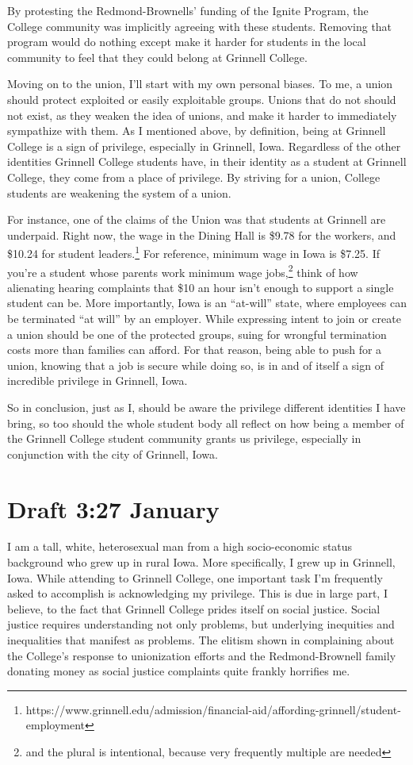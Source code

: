 \documentclass[12pt]{article}[titlepage]
\newcommand{\say}[1]{``#1''}
\newcommand{\1}{\={a}}
\newcommand{\2}{\={e}}
\newcommand{\3}{\={\i}}
\newcommand{\4}{\=o}
\newcommand{\5}{\=u}
\newcommand{\6}{\={A}}
\renewcommand{\,}{\textsuperscript{,}}
\begin{document}
By protesting the Redmond-Brownells' funding of the Ignite Program, the College community was implicitly agreeing with these students.
Removing that program would do nothing except make it harder for students in the local community to feel that they could belong at Grinnell College.

Moving on to the union, I'll start with my own personal biases.
To me, a union should protect exploited or easily exploitable groups.
Unions that do not should not exist, as they weaken the idea of unions, and make it harder to immediately sympathize with them.
As I mentioned above, by definition, being at Grinnell College is a sign of privilege, especially in Grinnell, Iowa.
Regardless of the other identities Grinnell College students have, in their identity as a student at Grinnell College, they come from a place of privilege.
By striving for a union, College students are weakening the system of a union.

For instance, one of the claims of the Union was that students at Grinnell are underpaid.
Right now, the wage in the Dining Hall is \$9.78 for the workers, and \$10.24 for student leaders.\footnote{https://www.grinnell.edu/admission/financial-aid/affording-grinnell/student-employment}
For reference, minimum wage in Iowa is \$7.25.
If you're a student whose parents work minimum wage jobs,\footnote{and the plural is intentional, because very frequently multiple are needed} think of how alienating hearing complaints that \$10 an hour isn't enough to support a single student can be.
More importantly, Iowa is an \say{at-will} state, where employees can be terminated \say{at will} by an employer.
While expressing intent to join or create a union should be one of the protected groups, suing for wrongful termination costs more than families can afford.
For that reason, being able to push for a union, knowing that a job is secure while doing so, is in and of itself a sign of incredible privilege in Grinnell, Iowa.

So in conclusion, just as I, should be aware the privilege different identities I have bring, so too should the whole student body all reflect on how being a member of the Grinnell College student community grants us privilege, especially in conjunction with the city of Grinnell, Iowa. 
\section{Draft 3:27 January}
I am a tall, white, heterosexual man from a high socio-economic status background who grew up in rural Iowa.
More specifically, I grew up in Grinnell, Iowa.
While attending to Grinnell College, one important task I'm frequently asked to accomplish is acknowledging my privilege.
This is due in large part, I believe, to the fact that Grinnell College prides itself on social justice.
Social justice requires understanding not only problems, but underlying inequities and inequalities that manifest as problems.
The elitism shown in complaining about the College's response to unionization efforts and the Redmond-Brownell family donating money as social justice complaints quite frankly horrifies me. 
\end{document}

